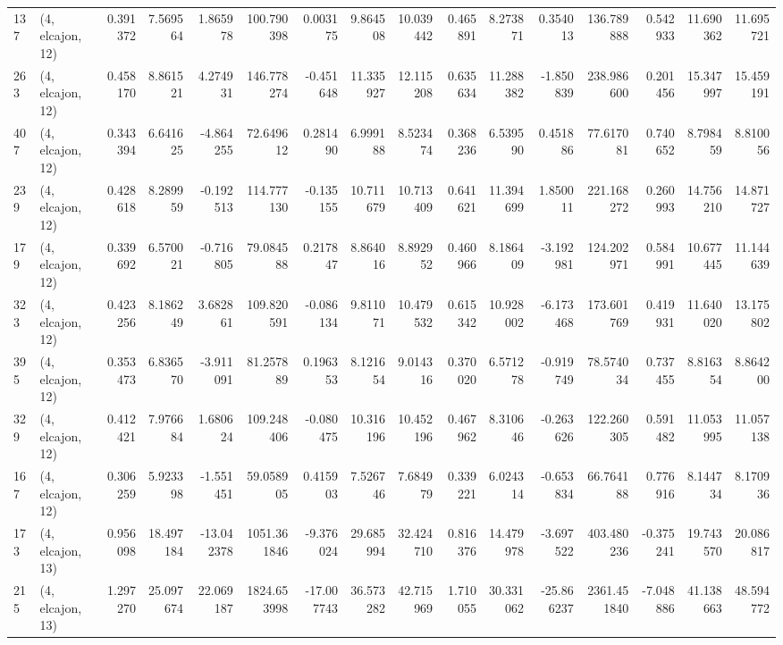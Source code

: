 \begin{tabular}{llrrrrrrrrrrrrrr}
137 &  (4, elcajon, 12) &   0.391372 &   7.569564 &   1.865978 &   100.790398 &   0.003175 &   9.864508 &  10.039442 &  0.465891 &   8.273871 &   0.354013 &   136.789888 &   0.542933 &  11.690362 &  11.695721 \\
263 &  (4, elcajon, 12) &   0.458170 &   8.861521 &   4.274931 &   146.778274 &  -0.451648 &  11.335927 &  12.115208 &  0.635634 &  11.288382 &  -1.850839 &   238.986600 &   0.201456 &  15.347997 &  15.459191 \\
407 &  (4, elcajon, 12) &   0.343394 &   6.641625 &  -4.864255 &    72.649612 &   0.281490 &   6.999188 &   8.523474 &  0.368236 &   6.539590 &   0.451886 &    77.617081 &   0.740652 &   8.798459 &   8.810056 \\
239 &  (4, elcajon, 12) &   0.428618 &   8.289959 &  -0.192513 &   114.777130 &  -0.135155 &  10.711679 &  10.713409 &  0.641621 &  11.394699 &   1.850011 &   221.168272 &   0.260993 &  14.756210 &  14.871727 \\
179 &  (4, elcajon, 12) &   0.339692 &   6.570021 &  -0.716805 &    79.084588 &   0.217847 &   8.864016 &   8.892952 &  0.460966 &   8.186409 &  -3.192981 &   124.202971 &   0.584991 &  10.677445 &  11.144639 \\
323 &  (4, elcajon, 12) &   0.423256 &   8.186249 &   3.682861 &   109.820591 &  -0.086134 &   9.811071 &  10.479532 &  0.615342 &  10.928002 &  -6.173468 &   173.601769 &   0.419931 &  11.640020 &  13.175802 \\
395 &  (4, elcajon, 12) &   0.353473 &   6.836570 &  -3.911091 &    81.257889 &   0.196353 &   8.121654 &   9.014316 &  0.370020 &   6.571278 &  -0.919749 &    78.574034 &   0.737455 &   8.816354 &   8.864200 \\
329 &  (4, elcajon, 12) &   0.412421 &   7.976684 &   1.680624 &   109.248406 &  -0.080475 &  10.316196 &  10.452196 &  0.467962 &   8.310646 &  -0.263626 &   122.260305 &   0.591482 &  11.053995 &  11.057138 \\
167 &  (4, elcajon, 12) &   0.306259 &   5.923398 &  -1.551451 &    59.058905 &   0.415903 &   7.526746 &   7.684979 &  0.339221 &   6.024314 &  -0.653834 &    66.764188 &   0.776916 &   8.144734 &   8.170936 \\
173 &  (4, elcajon, 13) &   0.956098 &  18.497184 & -13.042378 &  1051.361846 &  -9.376024 &  29.685994 &  32.424710 &  0.816376 &  14.479978 &  -3.697522 &   403.480236 &  -0.375241 &  19.743570 &  20.086817 \\
215 &  (4, elcajon, 13) &   1.297270 &  25.097674 &  22.069187 &  1824.653998 & -17.007743 &  36.573282 &  42.715969 &  1.710055 &  30.331062 & -25.866237 &  2361.451840 &  -7.048886 &  41.138663 &  48.594772 \\

\end{tabular}
